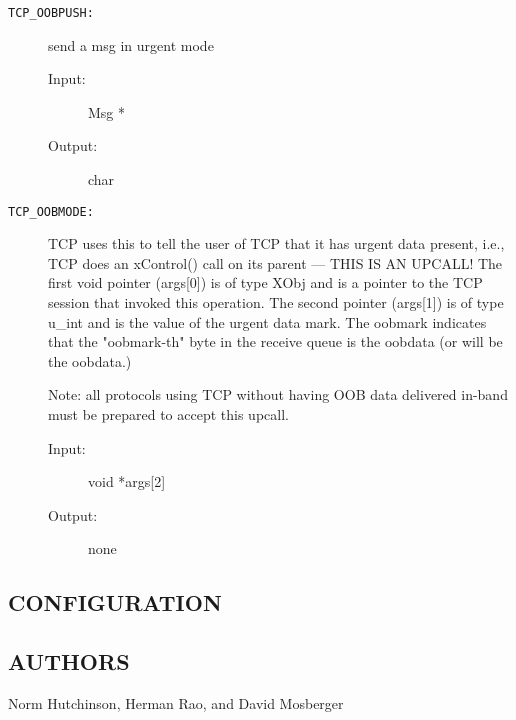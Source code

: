 \begin{description}
\item[{\tt TCP\_OOBPUSH:}]
send a msg in urgent mode
\begin{description}
\item[{\rm Input:}] Msg *
\item[{\rm Output:}] char
\end{description}



\item[{\tt TCP\_OOBMODE:}]
TCP uses this to tell the user of TCP that it has
urgent data present, i.e., TCP does an xControl() call on
its parent --- THIS IS AN UPCALL!
The first void pointer (args[0]) is of type XObj and is
a pointer to the TCP session that invoked this operation.
The second pointer (args[1]) is of type u\_int and is the
value of the urgent data mark. 
The oobmark indicates that the "oobmark-th" byte in the
receive queue is the oobdata (or will be the oobdata.)

Note: all protocols using TCP without having OOB data delivered
in-band must be prepared to accept this upcall.


\begin{description}
\item[{\rm Input:}] void *args[2]
\item[{\rm Output:}] none
\end{description}


\end{description}

\subsection*{CONFIGURATION}


\subsection*{AUTHORS}

Norm Hutchinson, Herman Rao, and David Mosberger

